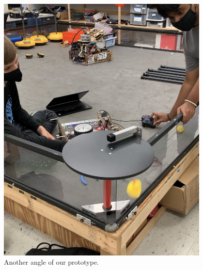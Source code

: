 \begin{figure}[ht]
\begin{minipage}[b]{.48\textwidth}
  \includegraphics[width=0.95\textwidth]{Meetings/September/09-28-21/9-28-21_Hardware_Image2 - Nathan Forrer.jpg}
  \caption{Another angle of our prototype.}
  \label{fig:pic2}
\end{minipage}
\end{figure}


